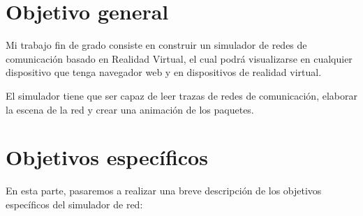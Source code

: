 \documentclass[a4paper, 12pt]{book}
\begin{document}
\section{Objetivo general} %
\label{sec:objetivo-general} %

Mi trabajo fin de grado consiste en construir un simulador de redes de comunicación basado en Realidad Virtual, el cual podrá visualizarse en cualquier dispositivo que tenga navegador web y en dispositivos de realidad virtual.

El simulador tiene que ser capaz de leer trazas de redes de comunicación, elaborar la escena de la red y crear una animación de los paquetes.

\section{Objetivos específicos}
\label{sec:objetivos-especificos}

En esta parte, pasaremos a realizar una breve descripción de los objetivos específicos del simulador de red:
\newpage
\end{document}
